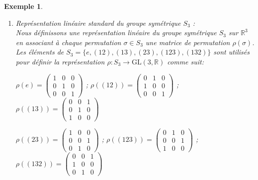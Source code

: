 \documentclass[a4paper, 14pt]{report}
\newtheorem{example}{Exemple}[section]
\begin{document}
\begin{onehalfspace}
{\begin{example}
\begin{enumerate}
		L'action de \( G \) sur \( V \) est donnée par multiplication scalaire :
		\[
		\rho(g)(v) = \lambda_g v, \quad \text{où } \lambda_g \in \mathbb{C}^\times \text{ et } v \in V.
		\]
		
		Soit \( W \subseteq V \) un sous-espace vectoriel stable par \( \rho \), c’est-à-dire tel que \( \rho(g)(w) \in W \) pour tout \( g \in G \) et tout \( w \in W \).
		
		Or, comme \( \dim V = 1 \), les seuls sous-espaces vectoriels de \( V \) sont \( \{0\} \) et \( V \) lui-même.
		
		Donc, les seuls sous-espaces stables par \( \rho \) sont triviaux.
		
		Par définition, une représentation est dite irréductible si elle ne possède aucun sous-espace \( G \)-stable non trivial. Ainsi, \( \rho \) est irréductible
		
		
		\item Représentation linéaire standard du groupe symétrique \( S_3 \) :\\
		Nous définissons une représentation linéaire du groupe symétrique \( S_3 \) sur \( \mathbb{R}^3 \) en associant à chaque permutation \( \sigma \in S_3 \) une matrice de permutation \( \rho(\sigma) \). Les éléments de \( S_3 = \{e, (12), (13), (23), (123), (132)\} \) sont utilisés pour définir la représentation \( \rho : S_3 \to \mathrm{GL}(3, \mathbb{R}) \) comme suit:
		
	\(	\rho(e) = \begin{pmatrix}
		1 & 0 & 0 \\
		0 & 1 & 0 \\
		0 & 0 & 1
	\end{pmatrix} 
	\) 	
;
		\(
		\rho((12)) = \begin{pmatrix}
			0 & 1 & 0 \\
			1 & 0 & 0 \\
			0 & 0 & 1
		\end{pmatrix}
		\)
;		
		\(
		\rho((13)) = \begin{pmatrix}
			0 & 0 & 1 \\
			0 & 1 & 0 \\
			1 & 0 & 0
		\end{pmatrix}
		\)
		
		
		\(
		\rho((23)) = \begin{pmatrix}
			1 & 0 & 0 \\
			0 & 0 & 1 \\
			0 & 1 & 0
		\end{pmatrix}
		\)
;
		\(
		\rho((123)) = \begin{pmatrix}
			0 & 1 & 0 \\
			0 & 0 & 1 \\
			1 & 0 & 0
		\end{pmatrix}
		\)
;		
		\(
		\rho((132)) = \begin{pmatrix}
			0 & 0 & 1 \\
			1 & 0 & 0 \\
			0 & 1 & 0
		\end{pmatrix}
		\)
		

\end{enumerate}
\end{example}}
\end{onehalfspace}
\end{document}
